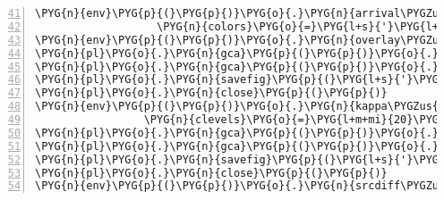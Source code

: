 \begin{Verbatim}[commandchars=\\\{\},numbers=left,firstnumber=41,stepnumber=1,codes={\catcode`\$=3\catcode`\^=7\catcode`\_=8}]
\PYG{n}{env}\PYG{p}{(}\PYG{p}{)}\PYG{o}{.}\PYG{n}{arrival\PYGZus{}plot}\PYG{p}{(}\PYG{n}{env}\PYG{p}{(}\PYG{p}{)}\PYG{o}{.}\PYG{n}{ensemble\PYGZus{}average}\PYG{p}{,} \PYG{n}{only\PYGZus{}contours}\PYG{o}{=}\PYG{n+nb+bp}{True}\PYG{p}{,}
                   \PYG{n}{colors}\PYG{o}{=}\PYG{l+s}{'}\PYG{l+s}{magenta}\PYG{l+s}{'}\PYG{p}{,} \PYG{n}{clevels}\PYG{o}{=}\PYG{l+m+mi}{40}\PYG{p}{)}
\PYG{n}{env}\PYG{p}{(}\PYG{p}{)}\PYG{o}{.}\PYG{n}{overlay\PYGZus{}input\PYGZus{}points}\PYG{p}{(}\PYG{n}{env}\PYG{p}{(}\PYG{p}{)}\PYG{o}{.}\PYG{n}{ensemble\PYGZus{}average}\PYG{p}{)}
\PYG{n}{pl}\PYG{o}{.}\PYG{n}{gca}\PYG{p}{(}\PYG{p}{)}\PYG{o}{.}\PYG{n}{axes}\PYG{o}{.}\PYG{n}{get\PYGZus{}xaxis}\PYG{p}{(}\PYG{p}{)}\PYG{o}{.}\PYG{n}{set\PYGZus{}visible}\PYG{p}{(}\PYG{n+nb+bp}{False}\PYG{p}{)}
\PYG{n}{pl}\PYG{o}{.}\PYG{n}{gca}\PYG{p}{(}\PYG{p}{)}\PYG{o}{.}\PYG{n}{axes}\PYG{o}{.}\PYG{n}{get\PYGZus{}yaxis}\PYG{p}{(}\PYG{p}{)}\PYG{o}{.}\PYG{n}{set\PYGZus{}visible}\PYG{p}{(}\PYG{n+nb+bp}{False}\PYG{p}{)}
\PYG{n}{pl}\PYG{o}{.}\PYG{n}{savefig}\PYG{p}{(}\PYG{l+s}{'}\PYG{l+s}{../tmp\PYGZus{}media/009719/img1.png}\PYG{l+s}{'}\PYG{p}{)}
\PYG{n}{pl}\PYG{o}{.}\PYG{n}{close}\PYG{p}{(}\PYG{p}{)}
\PYG{n}{env}\PYG{p}{(}\PYG{p}{)}\PYG{o}{.}\PYG{n}{kappa\PYGZus{}plot}\PYG{p}{(}\PYG{n}{env}\PYG{p}{(}\PYG{p}{)}\PYG{o}{.}\PYG{n}{ensemble\PYGZus{}average}\PYG{p}{,} \PYG{l+m+mi}{0}\PYG{p}{,} \PYG{n}{with\PYGZus{}contours}\PYG{o}{=}\PYG{n+nb+bp}{True}\PYG{p}{,}
                 \PYG{n}{clevels}\PYG{o}{=}\PYG{l+m+mi}{20}\PYG{p}{,} \PYG{n}{vmax}\PYG{o}{=}\PYG{l+m+mi}{1}\PYG{p}{,} \PYG{n}{with\PYGZus{}colorbar}\PYG{o}{=}\PYG{n+nb+bp}{False}\PYG{p}{)}
\PYG{n}{pl}\PYG{o}{.}\PYG{n}{gca}\PYG{p}{(}\PYG{p}{)}\PYG{o}{.}\PYG{n}{axes}\PYG{o}{.}\PYG{n}{get\PYGZus{}xaxis}\PYG{p}{(}\PYG{p}{)}\PYG{o}{.}\PYG{n}{set\PYGZus{}visible}\PYG{p}{(}\PYG{n+nb+bp}{False}\PYG{p}{)}
\PYG{n}{pl}\PYG{o}{.}\PYG{n}{gca}\PYG{p}{(}\PYG{p}{)}\PYG{o}{.}\PYG{n}{axes}\PYG{o}{.}\PYG{n}{get\PYGZus{}yaxis}\PYG{p}{(}\PYG{p}{)}\PYG{o}{.}\PYG{n}{set\PYGZus{}visible}\PYG{p}{(}\PYG{n+nb+bp}{False}\PYG{p}{)}
\PYG{n}{pl}\PYG{o}{.}\PYG{n}{savefig}\PYG{p}{(}\PYG{l+s}{'}\PYG{l+s}{../tmp\PYGZus{}media/009719/img2.png}\PYG{l+s}{'}\PYG{p}{)}
\PYG{n}{pl}\PYG{o}{.}\PYG{n}{close}\PYG{p}{(}\PYG{p}{)}
\PYG{n}{env}\PYG{p}{(}\PYG{p}{)}\PYG{o}{.}\PYG{n}{srcdiff\PYGZus{}plot}\PYG{p}{(}\PYG{n}{env}\PYG{p}{(}\PYG{p}{)}\PYG{o}{.}\PYG{n}{ensemble\PYGZus{}average}\PYG{p}{)}

\end{Verbatim}
